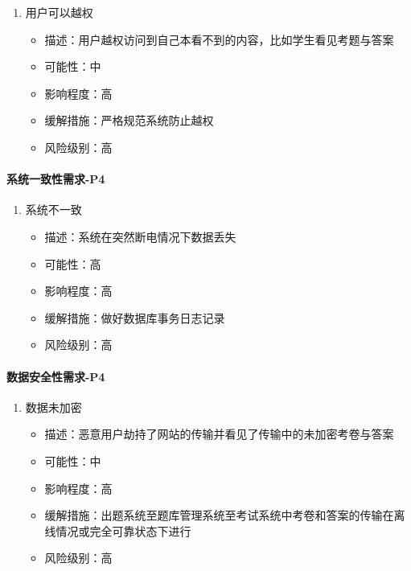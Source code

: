 \documentclass[hyperref, a4paper]{ctexart}
\providecommand{\tightlist}{%
  \setlength{\itemsep}{0pt}\setlength{\parskip}{0pt}}
\let\oldparagraph\paragraph
\renewcommand{\paragraph}[1]{\oldparagraph{#1}\mbox{}}
\begin{document}
\begin{enumerate}
\def\labelenumi{\arabic{enumi}.}
\tightlist
\item
  用户可以越权

  \begin{itemize}
  \tightlist
  \item
    描述：用户越权访问到自己本看不到的内容，比如学生看见考题与答案
  \item
    可能性：中
  \item
    影响程度：高
  \item
    缓解措施：严格规范系统防止越权
  \item
    风险级别：高
  \end{itemize}
\end{enumerate}

\hypertarget{ux7cfbux7edfux4e00ux81f4ux6027ux9700ux6c42-p4}{%
\paragraph{系统一致性需求-P4}\label{ux7cfbux7edfux4e00ux81f4ux6027ux9700ux6c42-p4}}

\begin{enumerate}
\def\labelenumi{\arabic{enumi}.}
\tightlist
\item
  系统不一致

  \begin{itemize}
  \tightlist
  \item
    描述：系统在突然断电情况下数据丢失
  \item
    可能性：高
  \item
    影响程度：高
  \item
    缓解措施：做好数据库事务日志记录
  \item
    风险级别：高
  \end{itemize}
\end{enumerate}

\hypertarget{ux6570ux636eux5b89ux5168ux6027ux9700ux6c42-p4}{%
\paragraph{数据安全性需求-P4}\label{ux6570ux636eux5b89ux5168ux6027ux9700ux6c42-p4}}

\begin{enumerate}
\def\labelenumi{\arabic{enumi}.}
\tightlist
\item
  数据未加密

  \begin{itemize}
  \tightlist
  \item
    描述：恶意用户劫持了网站的传输并看见了传输中的未加密考卷与答案
  \item
    可能性：中
  \item
    影响程度：高
  \item
    缓解措施：出题系统至题库管理系统至考试系统中考卷和答案的传输在离线情况或完全可靠状态下进行
  \item
    风险级别：高
  \end{itemize}
\end{enumerate}
\end{document}
